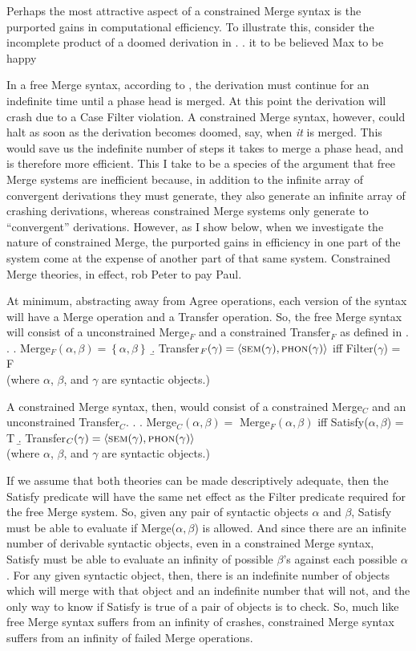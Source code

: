 \documentclass[MilwayThesis]{subfiles}
\begin{document}
Perhaps the most attractive aspect of a constrained Merge syntax is the purported gains in computational efficiency.
To illustrate this, \textcite{frampton2008crash} consider the incomplete product of a doomed derivation in \Next.
\ex. it to be believed Max to be happy

In a free Merge syntax, according to \textcite{frampton2008crash}, the derivation must continue for an indefinite time until a phase head is merged.
At this point the derivation will crash due to a Case Filter violation.
A constrained Merge syntax, however, could halt as soon as the derivation becomes doomed, say, when \textit{it} is merged.
This would save us the indefinite number of steps it takes to merge a phase head, and is therefore more efficient.
This I take to be a species of the argument that free Merge systems are inefficient because, in addition to the infinite array of convergent derivations they must generate, they also generate an infinite array of crashing derivations, whereas constrained Merge systems only generate to ``convergent'' derivations.
However, as I show below, when we investigate the nature of constrained Merge, the purported gains in efficiency in one part of the system come at the expense of another part of that same system.
Constrained Merge theories, in effect, rob Peter to pay Paul.

At minimum, abstracting away from Agree operations, each version of the syntax will have a Merge operation and a Transfer operation.
So, the free Merge syntax will consist of a unconstrained Merge$_F$ and a constrained Transfer$_F$ as defined in \Next.
\ex.
\a. Merge$_F(\alpha,\beta) = \left\{ \alpha, \beta \right\}$ 
\b. Transfer$_F(\gamma) = \langle\textsc{sem}(\gamma), \textsc{phon}(\gamma)\rangle$ iff Filter($\gamma$) = F\\
(where $\alpha$, $\beta$, and $\gamma$ are syntactic objects.)

A constrained Merge syntax, then, would consist of a constrained Merge$_C$ and an unconstrained Transfer$_C$.
\ex.
\a. Merge$_C(\alpha,\beta) =$ Merge$_F(\alpha,\beta)$ iff Satisfy($\alpha,\beta$) = T
\b. Transfer$_C(\gamma) = \langle\textsc{sem}(\gamma), \textsc{phon}(\gamma)\rangle$\\
(where $\alpha$, $\beta$, and $\gamma$ are syntactic objects.)

If we assume that both theories can be made descriptively adequate, then the Satisfy predicate will have the same net effect as the Filter predicate required for the free Merge system.
So, given any pair of syntactic objects $\alpha$ and $\beta$, Satisfy must be able to evaluate if Merge($\alpha,\beta$) is allowed.
And since there are an infinite number of derivable syntactic objects, even in a constrained Merge syntax, Satisfy must be able to evaluate an infinity of possible $\beta$'s against each possible $\alpha$.
For any given syntactic object, then, there is an indefinite number of objects which will merge with that object and an indefinite number that will not, and the only way to know if Satisfy is true of a pair of objects is to check.
So, much like free Merge syntax suffers from an infinity of crashes, constrained Merge syntax suffers from an infinity of failed Merge operations.
\end{document}
